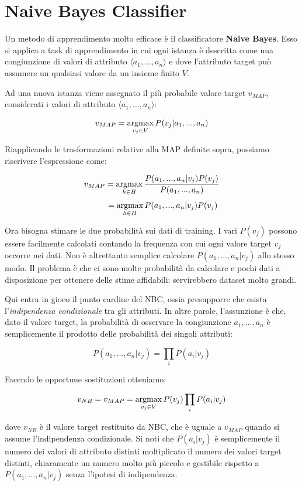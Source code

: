 \section{Naive Bayes Classifier}
Un metodo di apprendimento molto efficace è il classificatore \textbf{Naive Bayes}. Esso si applica a task di apprendimento in cui ogni istanza è descritta come una congiunzione di valori di attributo $\langle a_1, ..., a_n \rangle$ e dove l'attributo target può assumere un qualsiasi valore da un insieme finito $V$.

Ad una nuova istanza viene assegnato il più probabile valore target $v_{MAP}$, considerati i valori di attributo $\langle a_1, ..., a_n \rangle$:

$$ v_{MAP} = \operatorname*{argmax}_{v_j \in V} P(v_j | a_1, ..., a_n) $$

Riapplicando le trasformazioni relative alla MAP definite sopra, possiamo riscrivere l'espressione come:

$$v_{MAP} = \operatorname*{argmax}_{h \in H} \frac{P(a_1, ..., a_n | v_j) P(v_j)}{P(a_1, ..., a_n)} $$
$$\hphantom{11111} = \operatorname*{argmax}_{h \in H} P(a_1, ..., a_n | v_j) P(v_j) $$

Ora bisogna stimare le due probabilità sui dati di training. I vari $P(v_j)$ possono essere facilmente calcolati contando la frequenza con cui ogni valore target $v_j$ occorre nei dati. Non è altrettanto semplice calcolare $P(a_1, ..., a_n | v_j)$ allo stesso modo. Il problema è che ci sono molte probabilità da calcolare e pochi dati a disposizione per ottenere delle stime affidabili: servirebbero dataset molto grandi.

Qui entra in gioco il punto cardine del NBC, ossia presupporre che esista l'\emph{indipendenza condizionale} tra gli attributi. In altre parole, l'assunzione è che, dato il valore target, la probabilità di osservare la congiunzione $a_1, ..., a_n$ è semplicemente il prodotto delle probabilità dei singoli attributi:

$$ P(a_1, ..., a_n | v_j) = \prod_i P(a_i|v_j) $$

\noindent
Facendo le opportune sostituzioni otteniamo:

$$ v_{NB} = v_{MAP} = \operatorname*{argmax}_{v_j \in V} P(v_j) \prod_i P(a_i|v_j) $$

dove $v_{NB}$ è il valore target restituito da NBC, che è uguale a $v_{MAP}$ quando si assume l'indipendenza condizionale. Si noti che $P(a_i|v_j)$ è semplicemente il numero dei valori di attributo distinti moltiplicato il numero dei valori target distinti, chiaramente un numero molto più piccolo e gestibile rispetto a $P(a_1, ..., a_n | v_j)$ senza l'ipotesi di indipendenza. 

